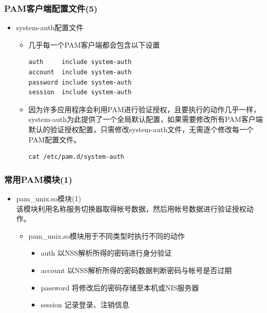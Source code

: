\documentclass[xcolor=svgnames,presentation]{beamer}
\begin{document}
\begin{frame}[fragile]
\frametitle{PAM客户端配置文件(5)}
\label{sec-6-9}
\begin{itemize}

\item system-auth配置文件
\label{sec-6-9-1}%
\begin{itemize}

\item 几乎每一个PAM客户端都会包含以下设置\\
\label{sec-6-9-1-1}%
\begin{verbatim}
auth     include system-auth
account  include system-auth
password include system-auth
session  include system-auth
\end{verbatim}

\item 因为许多应用程序会利用PAM进行验证授权，且要执行的动作几乎一样，system-auth为此提供了一个全局默认配置，如果需要修改所有PAM客户端默认的验证授权配置，只需修改system-auth文件，无需逐个修改每一个PAM配置文件。\\
\label{sec-6-9-1-2}%
\begin{verbatim}
cat /etc/pam.d/system-auth
\end{verbatim}
\end{itemize} %
\end{itemize} %
\end{frame}
\begin{frame}
\frametitle{常用PAM模块(1)}
\label{sec-6-10}
\begin{itemize}

\item pam\_unix.so模块(1)\\
\label{sec-6-10-1}%
该模块利用名称服务切换器取得帐号数据，然后用帐号数据进行验证授权动作。
\begin{itemize}

\item pam\_unix.so模块用于不同类型时执行不同的动作
\label{sec-6-10-1-1}%
\begin{itemize}

\item auth     以NSS解析所得的密码进行身分验证
\label{sec-6-10-1-1-1}%

\item account  以NSS解析所得的密码数据判断密码与帐号是否过期
\label{sec-6-10-1-1-2}%

\item password 将修改后的密码存储至本机或NIS服务器
\label{sec-6-10-1-1-3}%

\item session  记录登录、注销信息
\label{sec-6-10-1-1-4}%
\end{itemize} %
\end{itemize} %
\end{itemize} %
\end{frame}
\end{document}
